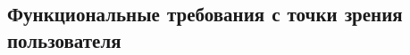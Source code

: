\documentclass{bmstu}
\begin{document}
  
  

  \subsection{Функциональные требования с точки зрения пользователя}
\end{document}
